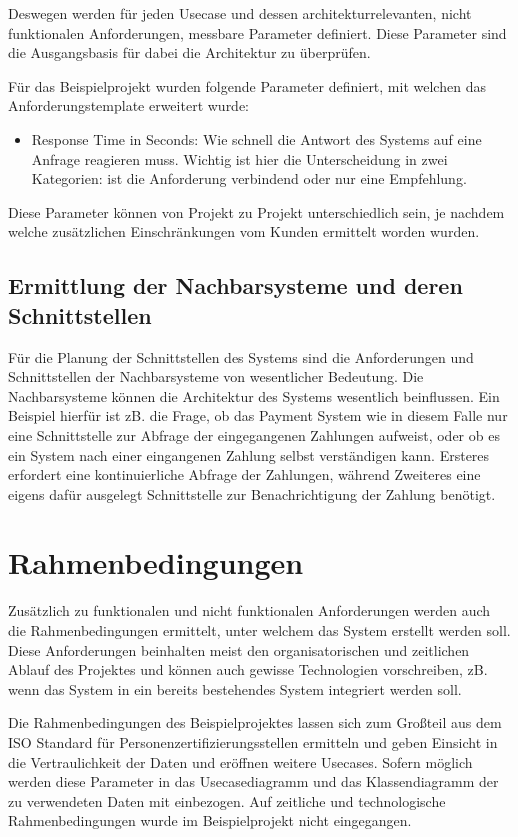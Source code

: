 Deswegen werden für jeden Usecase und dessen architekturrelevanten, nicht funktionalen Anforderungen, messbare Parameter definiert. Diese Parameter sind die Ausgangsbasis für dabei die Architektur zu überprüfen.

Für das Beispielprojekt wurden folgende Parameter definiert, mit welchen das Anforderungstemplate erweitert wurde:

\begin{itemize}
  \item Response Time in Seconds: Wie schnell die Antwort des Systems auf eine Anfrage reagieren muss. Wichtig ist hier die Unterscheidung in zwei Kategorien: ist die Anforderung verbindend oder nur eine Empfehlung.
\end{itemize}

Diese Parameter können von Projekt zu Projekt unterschiedlich sein, je nachdem welche zusätzlichen Einschränkungen vom Kunden ermittelt worden wurden.

\subsection{Ermittlung der Nachbarsysteme und deren Schnittstellen}
Für die Planung der Schnittstellen des Systems sind die Anforderungen und Schnittstellen der Nachbarsysteme von wesentlicher Bedeutung. Die Nachbarsysteme können die Architektur des Systems wesentlich beinflussen. Ein Beispiel hierfür ist zB. die Frage, ob das Payment System wie in diesem Falle nur eine Schnittstelle zur Abfrage der eingegangenen Zahlungen aufweist, oder ob es ein System nach einer eingangenen Zahlung selbst verständigen kann. Ersteres erfordert eine kontinuierliche Abfrage der Zahlungen, während Zweiteres eine eigens dafür ausgelegt Schnittstelle zur Benachrichtigung der Zahlung benötigt.

\section{Rahmenbedingungen}
Zusätzlich zu funktionalen und nicht funktionalen Anforderungen werden auch die Rahmenbedingungen ermittelt, unter welchem das System erstellt werden soll. Diese Anforderungen beinhalten meist den organisatorischen und zeitlichen Ablauf des Projektes und können auch gewisse Technologien vorschreiben, zB. wenn das System in ein bereits bestehendes System integriert werden soll. \cite[S. 9]{review}\cite[S. 110]{softarch}

Die Rahmenbedingungen des Beispielprojektes lassen sich zum Großteil aus dem ISO Standard für Personenzertifizierungsstellen ermitteln \cite{ISO_CERT} und geben Einsicht in die Vertraulichkeit der Daten und eröffnen weitere Usecases. Sofern möglich werden diese Parameter in das Usecasediagramm und das Klassendiagramm der zu verwendeten Daten mit einbezogen. Auf zeitliche und technologische Rahmenbedingungen wurde im Beispielprojekt nicht eingegangen.

